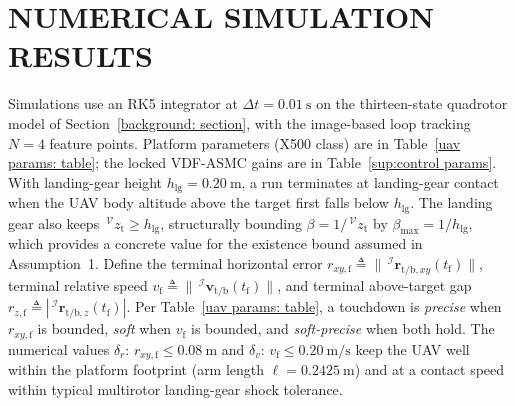 \documentclass{IEEEtaes}
\begin{document}
\section{NUMERICAL SIMULATION RESULTS}
\label{experimentation: section}
Simulations use an RK5 integrator at $\Delta t=0.01~\text{s}$ on the thirteen-state quadrotor model of Section~\ref{background: section}, with the image-based loop tracking $N=4$ feature points. Platform parameters (X500 class) are in Table~\ref{uav params: table}; the locked VDF-ASMC gains are in Table~\ref{sup:control params}. With landing-gear height $h_\text{lg}=0.20~\text{m}$, a run terminates at landing-gear contact when the UAV body altitude above the target first falls below $h_\text{lg}$. The landing gear also keeps $\,^\mathcal{V}z_\text{t}\ge h_\text{lg}$, structurally bounding $\beta=1/\,^\mathcal{V}z_\text{t}$ by $\beta_\text{max}=1/h_\text{lg}$, which provides a concrete value for the existence bound assumed in Assumption~1. Define the terminal horizontal error $r_{xy,\text{f}} \triangleq \|\,^\mathcal{I}\boldsymbol{r}_{\text{t/b},xy}(t_\text{f})\|$, terminal relative speed $v_\text{f} \triangleq \|\,^\mathcal{I}\boldsymbol{v}_{\text{t/b}}(t_\text{f})\|$, and terminal above-target gap $r_{z,\text{f}} \triangleq |\,^\mathcal{I}\boldsymbol{r}_{\text{t/b},z}(t_\text{f})|$. Per Table~\ref{uav params: table}, a touchdown is \emph{precise} when $r_{xy,\text{f}}$ is bounded, \emph{soft} when $v_\text{f}$ is bounded, and \emph{soft-precise} when both hold. The numerical values $\delta_r$: $r_{xy,\text{f}}\le 0.08~\text{m}$ and $\delta_v$: $v_\text{f}\le 0.20~\text{m/s}$ keep the UAV well within the platform footprint (arm length $\ell=0.2425~\text{m}$) and at a contact speed within typical multirotor landing-gear shock tolerance.
\end{document}
